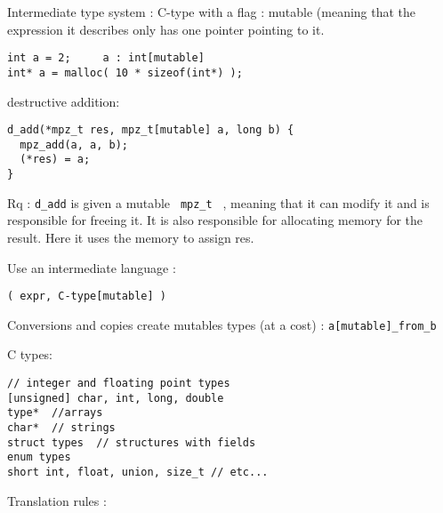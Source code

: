 \documentclass[12pt,a4paper]{article}
\newcommand{\cl}[1]{\texttt{#1}}
\newcommand{\mpzt}{ \texttt{ mpz\_t } }
\begin{document}
Intermediate type system :
C-type with a flag : mutable (meaning that the expression it describes only has one pointer pointing to it.

\begin{lstlisting}
int a = 2;     a : int[mutable]
int* a = malloc( 10 * sizeof(int*) );  
\end{lstlisting}

destructive addition:

\begin{lstlisting}
d_add(*mpz_t res, mpz_t[mutable] a, long b) {
  mpz_add(a, a, b);
  (*res) = a;
}
\end{lstlisting}

Rq : \cl{d\_add} is given a mutable \mpzt, meaning that it can modify it and is responsible for freeing it.
It is also responsible for allocating memory for the result.
Here it uses the memory to assign res.



Use an intermediate language :

\begin{lstlisting}
( expr, C-type[mutable] )
\end{lstlisting}

Conversions and copies create mutables types (at a cost) :
\cl{a[mutable]\_from\_b}

\cite{fillcomp}







C types:\\
\cite{huss2004c}
\begin{lstlisting}[caption=C types]
// integer and floating point types
[unsigned] char, int, long, double
type*  //arrays
char*  // strings
struct types  // structures with fields
enum types
short int, float, union, size_t // etc...
\end{lstlisting}


Translation rules :
\end{document}
